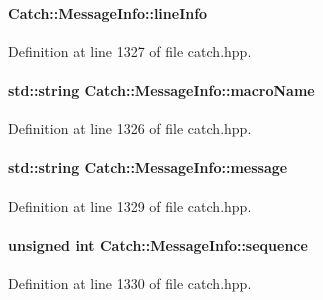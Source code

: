 \paragraph[{line\+Info}]{ Catch\+::\+Message\+Info\+::line\+Info}\label{a00050_a985165328723e599696ebd8e43195cc5}


Definition at line 1327 of file catch.\+hpp.

\hypertarget{a00050_a156ade4b3cc731f6ec7b542ae47ba8e3}{}
\paragraph[{macro\+Name}]{\setlength{\rightskip}{0pt plus 5cm}std\+::string Catch\+::\+Message\+Info\+::macro\+Name}\label{a00050_a156ade4b3cc731f6ec7b542ae47ba8e3}


Definition at line 1326 of file catch.\+hpp.

\hypertarget{a00050_ab6cd06e050bf426c6577502a5c50e256}{}
\paragraph[{message}]{\setlength{\rightskip}{0pt plus 5cm}std\+::string Catch\+::\+Message\+Info\+::message}\label{a00050_ab6cd06e050bf426c6577502a5c50e256}


Definition at line 1329 of file catch.\+hpp.

\hypertarget{a00050_a7f4f57ea21e50160adefce7b68a781d6}{}
\paragraph[{sequence}]{\setlength{\rightskip}{0pt plus 5cm}unsigned int Catch\+::\+Message\+Info\+::sequence}\label{a00050_a7f4f57ea21e50160adefce7b68a781d6}


Definition at line 1330 of file catch.\+hpp.

\hypertarget{a00050_ae928b9117465c696e45951d9d0284e78}{}
